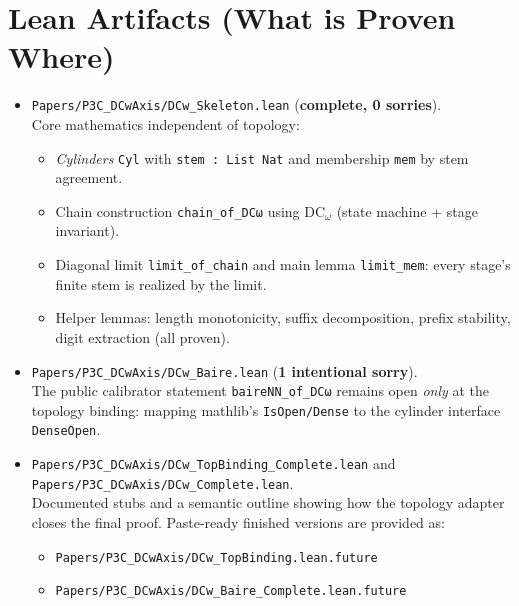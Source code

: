 \documentclass[11pt]{article}
\newcommand{\DCw}{\mathrm{DC}_\omega}
\theoremstyle{definition}
\theoremstyle{plain}
\begin{document}
\section{Lean Artifacts (What is Proven Where)}
\label{sec:artifacts}
\begin{itemize}[leftmargin=1.5em]
  \item \texttt{Papers/P3C\_DCwAxis/DCw\_Skeleton.lean} \;(\textbf{complete, 0 sorries}).\\
  Core mathematics independent of topology:
  \begin{itemize}[leftmargin=1.2em]
    \item \emph{Cylinders} \texttt{Cyl} with \texttt{stem : List Nat} and membership
      \texttt{mem} by stem agreement.
    \item Chain construction \texttt{chain\_of\_DCω} using $\DCw$ (state machine + stage invariant).
    \item Diagonal limit \texttt{limit\_of\_chain} and main lemma
      \texttt{limit\_mem}: every stage's finite stem is realized by the limit.
    \item Helper lemmas: length monotonicity, suffix decomposition, prefix stability,
      digit extraction (all proven).
  \end{itemize}

  \item \texttt{Papers/P3C\_DCwAxis/DCw\_Baire.lean} \;(\textbf{1 intentional sorry}).\\
  The public calibrator statement \texttt{baireNN\_of\_DCω} remains open
  \emph{only} at the topology binding: mapping mathlib's \texttt{IsOpen/Dense}
  to the cylinder interface \texttt{DenseOpen}.

  \item \texttt{Papers/P3C\_DCwAxis/DCw\_TopBinding\_Complete.lean} and
        \texttt{Papers/P3C\_DCwAxis/DCw\_Complete.lean}.\\
  Documented stubs and a semantic outline showing how the topology adapter
  closes the final proof. Paste‑ready finished versions are provided as:
  \begin{itemize}[leftmargin=1.2em]
    \item \texttt{Papers/P3C\_DCwAxis/DCw\_TopBinding.lean.future}
    \item \texttt{Papers/P3C\_DCwAxis/DCw\_Baire\_Complete.lean.future}
  \end{itemize}
\end{itemize}
\end{document}
